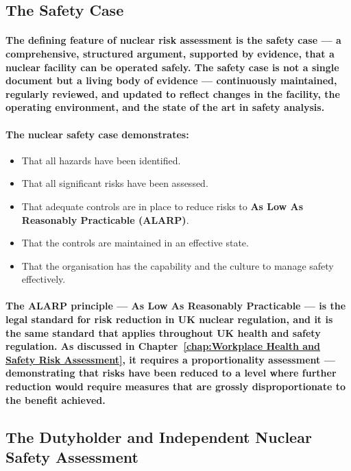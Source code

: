 \subsection{The Safety Case}
\paragraph{The defining feature of nuclear risk assessment is the \textbf{safety case} — a comprehensive, structured argument, supported by evidence, that a nuclear facility can be operated safely. The safety case is not a single document but a living body of evidence — continuously maintained, regularly reviewed, and updated to reflect changes in the facility, the operating environment, and the state of the art in safety analysis.}
\paragraph{The nuclear safety case demonstrates:}
\begin{itemize}
  \item{That all hazards have been identified.}
  \item{That all significant risks have been assessed.}
  \item{That adequate controls are in place to reduce risks to \textbf{As Low As Reasonably Practicable (ALARP)}.}
  \item{That the controls are maintained in an effective state.}
  \item{That the organisation has the capability and the culture to manage safety effectively.}
\end{itemize}
\paragraph{The \textbf{ALARP principle} — As Low As Reasonably Practicable — is the legal standard for risk reduction in UK nuclear regulation, and it is the same standard that applies throughout UK health and safety regulation. As discussed in Chapter~\ref{chap:Workplace Health and Safety Risk Assessment}, it requires a proportionality assessment — demonstrating that risks have been reduced to a level where further reduction would require measures that are grossly disproportionate to the benefit achieved.}

\subsection{The Dutyholder and Independent Nuclear Safety Assessment}
